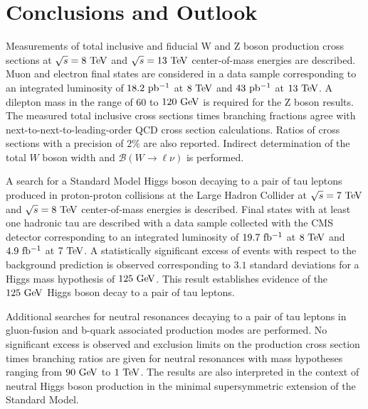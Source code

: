 \chapter{Conclusions and Outlook}

Measurements of total inclusive and fiducial W and Z boson production cross sections at $\sqrt{s}=8~\mathrm{Te\kern -0.1em V}$  and $\sqrt{s}=13~\mathrm{Te\kern -0.1em V}$ center-of-mass energies are described. Muon and electron final states are considered in a data sample corresponding to an integrated luminosity of $18.2~\mathrm{pb^{-1}}$ at $8~\mathrm{Te\kern -0.1em V}$ and $43~\mathrm{pb^{-1}}$ at $13~\mathrm{Te\kern -0.1em V}$. A dilepton mass in the range of $60$ to $120~\mathrm{Ge\kern -0.1em V}$ is required for the Z boson results. The measured total inclusive cross sections times branching fractions agree with next-to-next-to-leading-order QCD cross section calculations. Ratios of cross sections with a precision of $2\%$ are also reported. Indirect determination of the total $W$ boson width and $\mathcal{B}(W\rightarrow\ell\nu)$ is performed.

A search for a Standard Model Higgs boson decaying to a pair of tau leptons produced in proton-proton collisions at the Large Hadron Collider at $\sqrt{s}=7~\mathrm{Te\kern -0.1em V}$ and $\sqrt{s}=8~\mathrm{Te\kern -0.1em V}$ center-of-mass energies is described. Final states with at least one hadronic tau are described with a data sample collected with the CMS detector corresponding to an integrated luminosity of $19.7~\mathrm{fb^{-1}}$ at $8~\mathrm{Te\kern -0.1em V}$ and $4.9~\mathrm{fb^{-1}}$ at $7~\mathrm{Te\kern -0.1em V}$. A statistically significant excess of events with respect to the background prediction is observed corresponding to $3.1$ standard deviations for a Higgs mass hypothesis of $125~\mathrm{Ge\kern -0.1em V}$. This result establishes evidence of the $125~\mathrm{Ge\kern -0.1em V}$ Higgs boson decay to a pair of tau leptons. 

Additional searches for neutral resonances decaying to a pair of tau leptons in gluon-fusion and b-quark associated production modes are performed. No significant excess is observed and exclusion limits on the production cross section times branching ratios are given for neutral resonances with mass hypotheses ranging from $90~\mathrm{Ge\kern -0.1em V}$ to $1~\mathrm{Te\kern -0.1em V}$. The results are also interpreted in the context of neutral Higgs boson production in the minimal supersymmetric extension of the Standard Model. 

